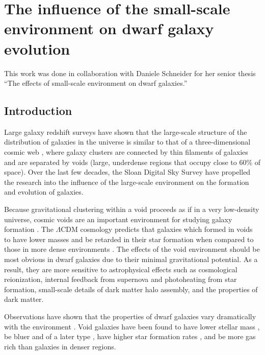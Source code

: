 \chapter[Small-scale environment]{The influence of the small-scale environment on dwarf galaxy evolution}


This work was done in collaboration with Daniele Schneider for her senior thesis 
``The effects of small-scale environment on dwarf galaxies.''




\section[Introduction]{Introduction}

Large galaxy redshift surveys have shown that the large-scale structure of the 
distribution of galaxies in the universe is similar to that of a 
three-dimensional cosmic web \citep{Bond96}, where galaxy clusters are connected 
by thin filaments of galaxies and are separated by voids (large, underdense 
regions that occupy close to 60\% of space).  Over the last few decades, the 
Sloan Digital Sky Survey \citep{Abazajian09,Ahn12} have propelled the research 
into the influence of the large-scale environment on the formation and evolution 
of galaxies.

Because gravitational clustering within a void proceeds as if in a very 
low-density universe, cosmic voids are an important environment for studying 
galaxy formation \citep[see][for a review]{vandeWeygaert11}.  The $\Lambda$CDM 
cosmology predicts that galaxies which formed in voids to have lower masses and 
be retarded in their star formation when compared to those in more dense 
environments \citep{Gottlober03,Goldberg05,Cen11}.  The effects of the void 
environment should be most obvious in dwarf galaxies due to their minimal 
gravitational potential.  As a result, they are more sensitive to astrophysical 
effects such as cosmological reionization, internal feedback from supernova and 
photoheating from star formation, small-scale details of dark matter halo 
assembly, and the properties of dark matter.

Observations have shown that the properties of dwarf galaxies vary dramatically 
with the environment \citep[e.g.,][]{Ann08,Geha12}.  Void galaxies have been 
found to have lower stellar mass \citep{Hoyle05,Croton05,Moorman15}, be bluer 
and of a later type \citep{Grogin00,Rojas04,Patiri06,Park07,vonBendaBeckmann08,
Hoyle12}, have higher star formation rates \citep{Rojas05,Moorman15,Beygu16}, 
and be more gas rich \citep{Kreckel12,Moorman16,Jones16} than galaxies in denser 
regions.

